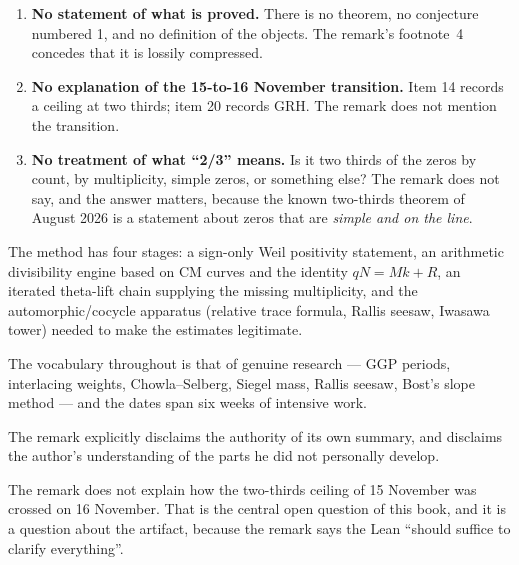 \begin{enumerate}
\item \textbf{No statement of what is proved.} There is no theorem, no
conjecture numbered 1, and no definition of the objects. The remark's
footnote~4 concedes that it is lossily compressed.
\item \textbf{No explanation of the 15-to-16 November transition.} Item 14
records a ceiling at two thirds; item 20 records GRH. The remark does not
mention the transition.
\item \textbf{No treatment of what ``2/3'' means.} Is it two thirds of the
zeros by count, by multiplicity, simple zeros, or something else? The remark
does not say, and the answer matters, because the known two-thirds theorem of
August 2026 is a statement about zeros that are \emph{simple and on the line}.
\end{enumerate}

\begin{keytakeaways}

\item The method has four stages: a sign-only Weil positivity statement, an
arithmetic divisibility engine based on CM curves and the identity
$qN = Mk + R$, an iterated theta-lift chain supplying the missing multiplicity,
and the automorphic/cocycle apparatus (relative trace formula, Rallis seesaw,
Iwasawa tower) needed to make the estimates legitimate.
\item The vocabulary throughout is that of genuine research --- GGP periods,
interlacing weights, Chowla--Selberg, Siegel mass, Rallis seesaw, Bost's
slope method --- and the dates span six weeks of intensive work.
\item The remark explicitly disclaims the authority of its own summary, and
disclaims the author's understanding of the parts he did not personally
develop.
\item The remark does not explain how the two-thirds ceiling of 15 November
was crossed on 16 November. That is the central open question of this book,
and it is a question about the artifact, because the remark says the Lean
``should suffice to clarify everything''.
\end{keytakeaways}

